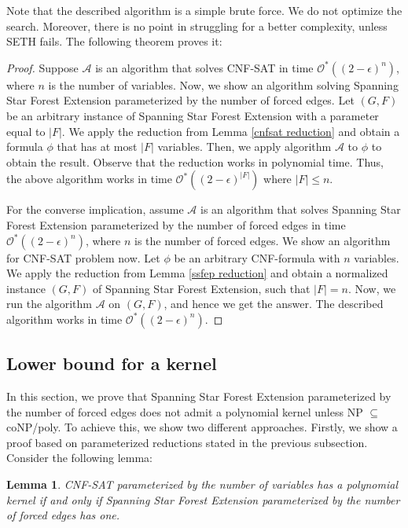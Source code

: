 \documentclass[en]{pracamgr}
\newtheorem{lemma}{Lemma}
\theoremstyle{definition}
\newcommand{\ssfep}{{\sc Spanning Star Forest Extension}}
\newcommand{\cnfsat}{{\sc CNF-SAT}}
\begin{document}
Note that the described algorithm is a simple brute force. We do not optimize the search. Moreover, there is no point in struggling for a better complexity, unless SETH fails. The following theorem proves it:

\thmssfepseth*

\begin{proof}
	Suppose $\mathcal{A}$ is an algorithm that solves \cnfsat{} in time $\mathcal{O}^*((2-\epsilon)^n)$, where $n$ is the number of variables. Now, we show an algorithm solving \ssfep{} parameterized by the number of forced edges. Let $(G,F)$ be an arbitrary instance of \ssfep{} with a parameter equal to $|F|$. We apply the reduction from Lemma \ref{cnfsat reduction} and obtain a formula $\phi$ that has at most $|F|$ variables. Then, we apply algorithm $\mathcal{A}$ to $\phi$ to obtain the result. Observe that the reduction works in polynomial time. Thus, the above algorithm works in time $\mathcal{O}^*((2-\epsilon)^{|F|})$ where $|F| \leq n$.
	
	For the converse implication, assume $\mathcal{A}$ is an algorithm that solves \ssfep{} parameterized by the number of forced edges in time $\mathcal{O}^*((2-\epsilon)^n)$, where $n$ is the number of forced edges. We show an algorithm for \cnfsat{} problem now. Let $\phi$ be an arbitrary CNF-formula with $n$ variables. We apply the reduction from Lemma \ref{ssfep reduction} and obtain a normalized instance $(G,F)$ of \ssfep{}, such that $|F|=n$. Now, we run the algorithm $\mathcal{A}$ on $(G,F)$, and hence we get the answer. The described algorithm works in time $\mathcal{O}^*((2-\epsilon)^n)$.
\end{proof}

\subsection{Lower bound for a kernel}

In this section, we prove that \ssfep{} parameterized by the number of forced edges does not admit a polynomial kernel unless NP $\subseteq$ coNP/poly. To achieve this, we show two different approaches. Firstly, we show a proof based on parameterized reductions stated in the previous subsection. Consider the following lemma:

\begin{lemma}\label{kernel}
	\cnfsat{} parameterized by the number of variables has a polynomial kernel if and only if \ssfep{} parameterized by the number of forced edges has one.
\end{lemma}
\end{document}
